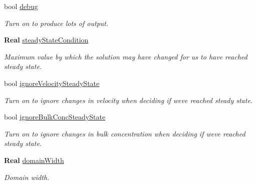 \begin{DoxyCompactItemize}
bool \hyperlink{struct_mushy_layer_options_a590103c8a5df7418f6df6e717a842e67}{debug}
\begin{DoxyCompactList}\small\item\em Turn on to produce lots of output. \end{DoxyCompactList}\item 
\mbox{\label{struct_mushy_layer_options_abb4138937326352ee9ae6365c0c60315}} 
\textbf{ Real} \hyperlink{struct_mushy_layer_options_abb4138937326352ee9ae6365c0c60315}{steady\+State\+Condition}
\begin{DoxyCompactList}\small\item\em Maximum value by which the solution may have changed for us to have reached steady state. \end{DoxyCompactList}\item 
\mbox{\label{struct_mushy_layer_options_a0646a4ef0e7bbfb0bc7840b6d07e5c31}} 
bool \hyperlink{struct_mushy_layer_options_a0646a4ef0e7bbfb0bc7840b6d07e5c31}{ignore\+Velocity\+Steady\+State}
\begin{DoxyCompactList}\small\item\em Turn on to ignore changes in velocity when deciding if we\textquotesingle{}ve reached steady state. \end{DoxyCompactList}\item 
\mbox{\label{struct_mushy_layer_options_ab5c5847187f48b651e3b6119b4d0d39d}} 
bool \hyperlink{struct_mushy_layer_options_ab5c5847187f48b651e3b6119b4d0d39d}{ignore\+Bulk\+Conc\+Steady\+State}
\begin{DoxyCompactList}\small\item\em Turn on to ignore changes in bulk concentration when deciding if we\textquotesingle{}ve reached steady state. \end{DoxyCompactList}\item 
\mbox{\label{struct_mushy_layer_options_af1cae497f7c9a1053d5584851105986d}} 
\textbf{ Real} \hyperlink{struct_mushy_layer_options_af1cae497f7c9a1053d5584851105986d}{domain\+Width}
\begin{DoxyCompactList}\small\item\em Domain width. \end{DoxyCompactList}\item 

\end{DoxyCompactItemize}
